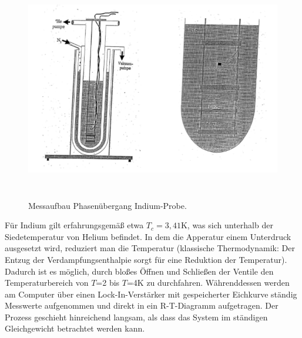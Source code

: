 \begin{figure}[h!]
	\centering
	\includegraphics[height=8cm]{Aufbau.png}	
	~ %
	\caption{Messaufbau Phasenübergang Indium-Probe. \cite{Anleitung}}
	\label{aufbau}
\end{figure}

Für Indium gilt erfahrungsgemäß etwa $T_c=3,41$K, was sich unterhalb der Siedetemperatur von Helium befindet. In dem die Apperatur einem Unterdruck ausgesetzt wird, reduziert man die Temperatur (klassische Thermodynamik: Der Entzug der Verdampfungsenthalpie sorgt für eine Reduktion der Temperatur). Dadurch ist es möglich, durch bloßes Öffnen und Schließen der Ventile den Temperaturbereich von $T$=2 bis $T$=4K zu durchfahren. Währenddessen werden am Computer über einen Lock-In-Verstärker mit gespeicherter Eichkurve ständig Messwerte aufgenommen und direkt in ein R-T-Diagramm aufgetragen. Der Prozess geschieht hinreichend langsam, als dass das System im ständigen Gleichgewicht betrachtet werden kann.
